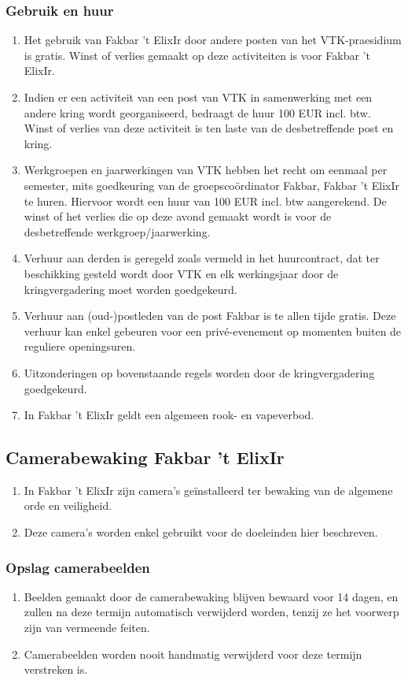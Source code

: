     \subsubsection{Gebruik en huur}
    \begin{enumerate}
        \item Het gebruik van Fakbar 't ElixIr door andere posten van het VTK-praesidium is gratis. Winst of verlies gemaakt op deze activiteiten is voor Fakbar 't ElixIr.
        \item Indien er een activiteit van een post van VTK in samenwerking met een andere kring wordt georganiseerd, bedraagt de huur 100 EUR incl. btw. Winst of verlies van deze activiteit is ten laste van de desbetreffende post en kring. 
        \item Werkgroepen en jaarwerkingen van VTK hebben het recht om eenmaal per semester, mits goedkeuring van de groepsco\"ordinator Fakbar, Fakbar 't ElixIr te huren. Hiervoor wordt een huur van 100 EUR incl. btw aangerekend. De winst of het verlies die op deze avond gemaakt wordt is voor de desbetreffende werkgroep/jaarwerking.
        \item Verhuur aan derden is geregeld zoals vermeld in het huurcontract, dat ter beschikking gesteld wordt door VTK en elk werkingsjaar door de kringvergadering moet worden goedgekeurd.
        \item Verhuur aan (oud-)postleden van de post Fakbar is te allen tijde gratis. Deze verhuur kan enkel gebeuren voor een priv\'e-evenement op momenten buiten de reguliere openingsuren.
        \item Uitzonderingen op bovenstaande regels worden door de kringvergadering goedgekeurd.
        \item In Fakbar 't ElixIr geldt een algemeen rook- en vapeverbod.
    \end{enumerate}


\subsection{Camerabewaking Fakbar 't ElixIr}
    \begin{enumerate}
        \item In Fakbar 't ElixIr zijn camera's ge\"installeerd ter bewaking van de algemene orde en veiligheid. 
        \item Deze camera's worden enkel gebruikt voor de doeleinden hier beschreven.
    \end{enumerate}
    \subsubsection{Opslag camerabeelden}
    \begin{enumerate}
        \item Beelden gemaakt door de camerabewaking blijven bewaard voor 14 dagen, en zullen na deze termijn automatisch verwijderd worden, tenzij ze het voorwerp zijn van vermeende feiten.
        \item Camerabeelden worden nooit handmatig verwijderd voor deze termijn verstreken is.
    \end{enumerate}

